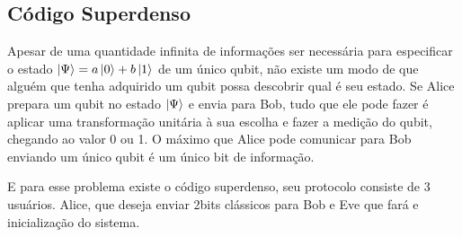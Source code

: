 \documentclass[a4paper, 12pt, oneside]{book}
\begin{document}
\subsection{Código Superdenso}

Apesar de uma quantidade infinita de informações ser necessária para especificar o estado $\ket{\Psi}=a\ket{0}+b\ket{1}$ de um único qubit, não existe um modo de que alguém que tenha adquirido um qubit possa descobrir qual é seu estado. Se Alice prepara um qubit no estado $\ket{\Psi}$ e envia para Bob, tudo que ele pode fazer é aplicar uma transformação unitária à sua escolha e fazer a medição do qubit, chegando ao valor 0 ou 1. O máximo que Alice pode comunicar para Bob enviando um único qubit é um único bit de informação.

E para esse problema existe o código superdenso, seu protocolo consiste de 3 usuários. Alice, que deseja enviar 2bits clássicos para Bob e Eve que fará e inicialização do sistema.
\end{document}
